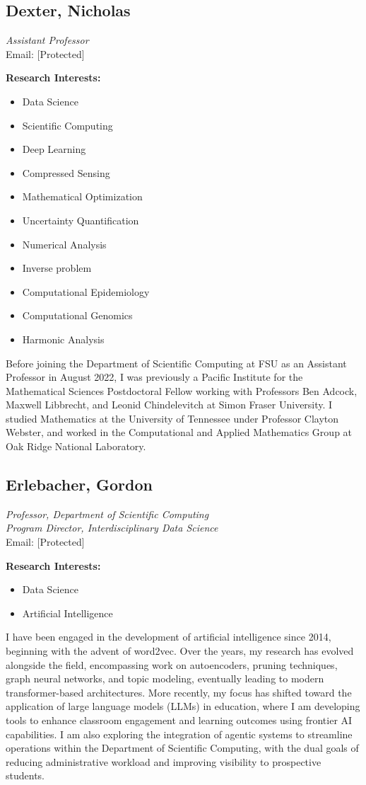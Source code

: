\documentclass[12pt,a4paper]{article}
\begin{document}
\subsection{Dexter, Nicholas}
\textit{Assistant Professor} \\
Email: [Protected]

\textbf{Research Interests:}
\begin{itemize}
    \item Data Science
    \item Scientific Computing
    \item Deep Learning
    \item Compressed Sensing
    \item Mathematical Optimization
    \item Uncertainty Quantification
    \item Numerical Analysis
    \item Inverse problem
    \item Computational Epidemiology
    \item Computational Genomics
    \item Harmonic Analysis
\end{itemize}

Before joining the Department of Scientific Computing at FSU as an Assistant Professor in August 2022, I was previously a Pacific Institute for the Mathematical Sciences Postdoctoral Fellow working with Professors Ben Adcock, Maxwell Libbrecht, and Leonid Chindelevitch at Simon Fraser University. I studied Mathematics at the University of Tennessee under Professor Clayton Webster, and worked in the Computational and Applied Mathematics Group at Oak Ridge National Laboratory.

\subsection{Erlebacher, Gordon}
\textit{Professor, Department of Scientific Computing} \\
\textit{Program Director, Interdisciplinary Data Science} \\
Email: [Protected]

\textbf{Research Interests:}
\begin{itemize}
    \item Data Science
    \item Artificial Intelligence
\end{itemize}

I have been engaged in the development of artificial intelligence since 2014, beginning with the advent of word2vec. Over the years, my research has evolved alongside the field, encompassing work on autoencoders, pruning techniques, graph neural networks, and topic modeling, eventually leading to modern transformer-based architectures. More recently, my focus has shifted toward the application of large language models (LLMs) in education, where I am developing tools to enhance classroom engagement and learning outcomes using frontier AI capabilities. I am also exploring the integration of agentic systems to streamline operations within the Department of Scientific Computing, with the dual goals of reducing administrative workload and improving visibility to prospective students.
\end{document}
